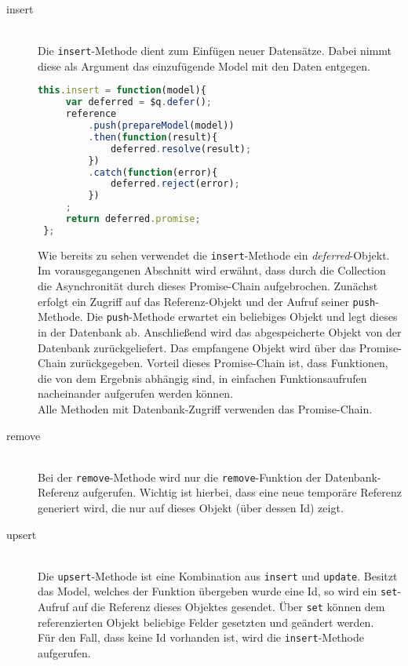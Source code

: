 \begin{description}

\item[insert]\hfill \\
Die \texttt{insert}-Methode dient zum Einfügen neuer Datensätze. Dabei nimmt diese als Argument das einzufügende Model mit den Daten entgegen.
 \begin{lstlisting}[language=Javascript, label=code_CollectionInsert, caption=Insert-Methode einer Collection]
 this.insert = function(model){
     var deferred = $q.defer();
     reference
         .push(prepareModel(model))
         .then(function(result){
             deferred.resolve(result);
         })
         .catch(function(error){
             deferred.reject(error);
         })
     ;
     return deferred.promise;
 };
 \end{lstlisting}

 Wie bereits zu sehen verwendet die \texttt{insert}-Methode ein \textit{deferred}-Objekt. Im vorausgegangenen Abschnitt wird erwähnt, dass durch die Collection die Asynchronität durch dieses
 Promise-Chain aufgebrochen. Zunächst erfolgt ein Zugriff auf das Referenz-Objekt und der Aufruf seiner \texttt{push}-Methode. Die \texttt{push}-Methode erwartet ein beliebiges Objekt
 und legt dieses in der Datenbank ab. Anschließend wird das abgespeicherte Objekt von der Datenbank zurückgeliefert.
 Das empfangene Objekt wird über das Promise-Chain zurückgegeben.
 Vorteil dieses Promise-Chain ist, dass Funktionen, die von dem Ergebnis abhängig sind, in einfachen Funktionsaufrufen nacheinander aufgerufen werden können.\\
 Alle Methoden mit Datenbank-Zugriff verwenden das Promise-Chain.

\item[remove]\hfill \\
Bei der \texttt{remove}-Methode wird nur die \texttt{remove}-Funktion der Datenbank-Referenz aufgerufen. Wichtig ist hierbei, dass eine neue temporäre Referenz generiert wird, die nur
auf dieses Objekt (über dessen Id) zeigt.

\item[upsert]\hfill \\
Die \texttt{upsert}-Methode ist eine Kombination aus \texttt{insert} und \texttt{update}. Besitzt das Model, welches der Funktion übergeben wurde eine Id, so wird ein \texttt{set}-Aufruf auf die Referenz
dieses Objektes gesendet. Über \texttt{set} können dem referenzierten Objekt beliebige Felder gesetzten und geändert werden.\\
Für den Fall, dass keine Id vorhanden ist, wird die \texttt{insert}-Methode aufgerufen.


\end{description}
